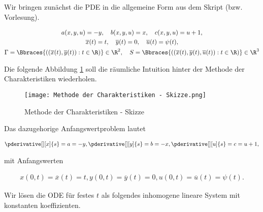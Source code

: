 \begin{solution}

Wir bringen zunächst die PDE in die allgemeine Form aus dem Skript (bzw. Vorlesung).

\begin{gather*}
    a(x, y, u) = -y,
    \quad
    b(x, y, u) = x,
    \quad
    c(x, y, u) = u + 1, \\
    \overline{x}(t) = t,
    \quad
    \overline{y}(t) = 0,
    \quad
    \overline{u}(t) = \psi(t), \\
    \Gamma = \Bbraces
    {
        (
            (
                \overline{x}(t),
                \overline{y}(t)
            ):
            t \in \R
        )
    } \in \R^2,
    \quad
    S = \Bbraces
    {
        (
            (
                \overline{x}(t),
                \overline{y}(t),
                \overline{u}(t)
            ):
            t \in \R
        )
    } \in \R^3
\end{gather*}

Die folgende Abbildung \ref{fig:MdCS} soll die räumliche Intuition hinter der Methode der Charakteristiken wiederholen.

\begin{figure}[h!]
    \centering
    \texttt{[image: Methode der Charakteristiken - Skizze.png]}
    \caption{Methode der Charakteristiken - Skizze}
    \label{fig:MdCS}
\end{figure}

Das dazugehorige Anfangswertproblem lautet

\begin{align*}
    \pderivative[][x]{s} = a = -y,
    \pderivative[][y]{s} = b = -x,
    \pderivative[][u]{s} = c = u + 1,
\end{align*}

mit Anfangswerten

\begin{align*}
    x(0, t) = \overline{x}(t) = t,
    y(0, t) = \overline{y}(t) = 0,
    u(0, t) = \overline{u}(t) = \psi(t).
\end{align*}

Wir lösen die ODE für festes $t$ als folgendes inhomogene lineare System mit konstanten koeffizienten.


\end{solution}
